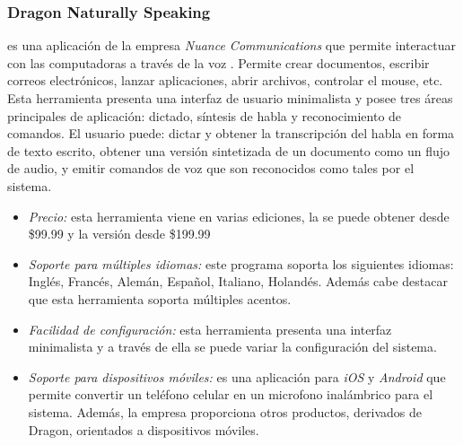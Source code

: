 \subsubsection{Dragon Naturally Speaking}
\label{sec:nuance}

 es una aplicaci\'on de la empresa \emph{Nuance Communications} que permite
interactuar con las computadoras a trav\'es de la voz \cite{DragonNaturallySpeaking}. Permite
crear documentos, escribir correos electr\'onicos, lanzar aplicaciones, abrir archivos, controlar
el mouse, etc. Esta herramienta presenta una interfaz de usuario minimalista y posee tres
\'areas principales de aplicaci\'on: dictado, s\'intesis de habla y reconocimiento de comandos. El
usuario puede: dictar y obtener la transcripci\'on del habla en forma de texto escrito, obtener
una versi\'on sintetizada de un documento como un flujo de audio, y emitir comandos de voz que
son reconocidos como tales por el sistema.

\begin{itemize}
    \item \emph{Precio:} esta herramienta viene en varias ediciones, la  se puede
        obtener desde \$99.99 y la versi\'on  desde \$199.99
    \item \emph{Soporte para m\'ultiples idiomas:} este programa soporta los siguientes idiomas: Ingl\'es, Franc\'es,
	Alem\'an, Espa\~nol, Italiano, Holand\'es. Adem\'as cabe destacar que esta herramienta soporta m\'ultiples
	acentos.
    \item \emph{Facilidad de configuraci\'on:} esta herramienta presenta una interfaz minimalista y a trav\'es de ella
	se puede variar la configuraci\'on del sistema.
    \item \emph{Soporte para dispositivos m\'oviles:}  es una aplicaci\'on para \emph{iOS} y
	\emph{Android} que permite convertir un tel\'efono celular en un microfono inal\'ambrico para el sistema. Adem\'as,
	la empresa  proporciona otros productos, derivados de Dragon, orientados a dispositivos
	m\'oviles.
\end{itemize}
